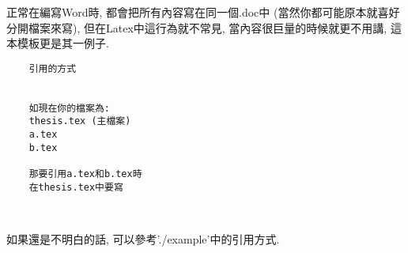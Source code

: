 
正常在編寫Word時, 都會把所有內容寫在同一個.doc中 (當然你都可能原本就喜好分開檔案來寫), 但在Latex中這行為就不常見, 當內容很巨量的時候就更不用講, 這本模板更是其一例子.

  \EmptyLine
  \begin{fmpage}{\textwidth}
  \begin{verbatim}
    引用的方式
    

    如現在你的檔案為:
    thesis.tex (主檔案)
    a.tex
    b.tex

    那要引用a.tex和b.tex時
    在thesis.tex中要寫
    
    
  \end{verbatim}
  \end{fmpage}
  \EmptyLine

如果還是不明白的話, 可以參考'./example'中的引用方式.

